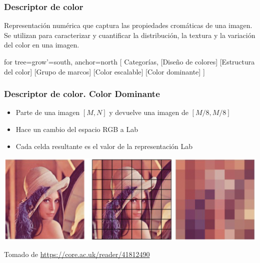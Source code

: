 \documentclass[
10pt, %
aspectratio=169, %
]{beamer}
\begin{document}
	\begin{frame}
		
		\frametitle{Descriptor de color}
		
		\begin{alertblock}{}
			Representación numérica que captura las propiedades cromáticas de una imagen. Se utilizan para caracterizar y cuantificar la distribución, la textura y la variación del color en una imagen.
		\end{alertblock}
		
		\pause
		\vspace{2\baselineskip}
		\centering
		\begin{forest}
			for tree={grow'=south, anchor=north}
			[ Categorías, 
			[Diseño de colores]
			[Estructura del color]
			[Grupo de marcos]
			[Color escalable]
			[Color dominante] 
			]
		\end{forest}
		
		
	\end{frame}
	
	\begin{frame}
		
		\frametitle{Descriptor de color. Color Dominante}
		
		\begin{itemize}
			\item Parte de una imagen $[M, N]$ y devuelve una imagen de $[M/8, M/8]$
			\item Hace un cambio del espacio RGB a Lab
			\item Cada celda resultante es el valor de la representación Lab
		\end{itemize}
		
		\vspace{1\baselineskip}
		\pause
		\centering
		\includegraphics[scale=0.45]{dlc.png} 
		
		{\scriptsize Tomado de \url{https://core.ac.uk/reader/41812490}}
		
	\end{frame}
	
\end{document}

